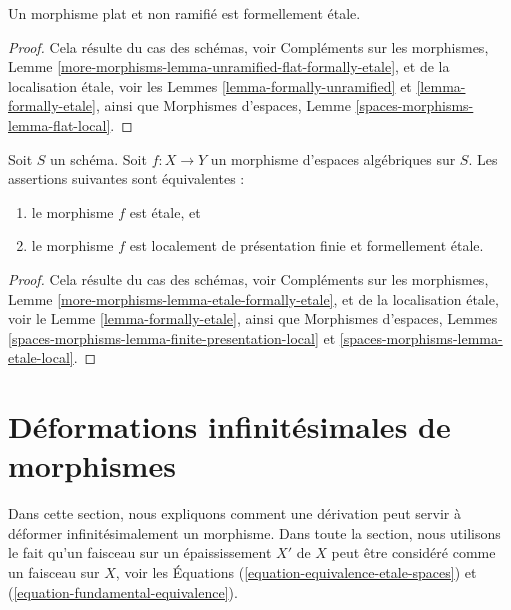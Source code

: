 \begin{lemma}
\label{lemma-unramified-flat-formally-etale}
Un morphisme plat et non ramifié est formellement étale.
\end{lemma}

\begin{proof}
Cela résulte du cas des schémas, voir
Compléments sur les morphismes,
Lemme \ref{more-morphisms-lemma-unramified-flat-formally-etale},
et de la localisation étale, voir les
Lemmes \ref{lemma-formally-unramified} et \ref{lemma-formally-etale},
ainsi que
Morphismes d'espaces, Lemme \ref{spaces-morphisms-lemma-flat-local}.
\end{proof}

\begin{lemma}
\label{lemma-etale-formally-etale}
Soit $S$ un schéma.
Soit $f : X \to Y$ un morphisme d'espaces algébriques sur $S$.
Les assertions suivantes sont équivalentes :
\begin{enumerate}
\item le morphisme $f$ est étale, et
\item le morphisme $f$ est localement de présentation finie et
formellement étale.
\end{enumerate}
\end{lemma}

\begin{proof}
Cela résulte du cas des schémas, voir
Compléments sur les morphismes,
Lemme \ref{more-morphisms-lemma-etale-formally-etale},
et de la localisation étale, voir le
Lemme \ref{lemma-formally-etale},
ainsi que
Morphismes d'espaces,
Lemmes \ref{spaces-morphisms-lemma-finite-presentation-local} et
\ref{spaces-morphisms-lemma-etale-local}.
\end{proof}















\section{Déformations infinitésimales de morphismes}
\label{section-action-by-derivations}

\noindent
Dans cette section, nous expliquons comment une dérivation peut servir à
déformer infinitésimalement un morphisme. Dans toute la section, nous utilisons le fait qu'un
faisceau sur un épaississement $X'$ de $X$ peut être considéré comme un faisceau sur $X$, voir les
Équations (\ref{equation-equivalence-etale-spaces}) et
(\ref{equation-fundamental-equivalence}).

